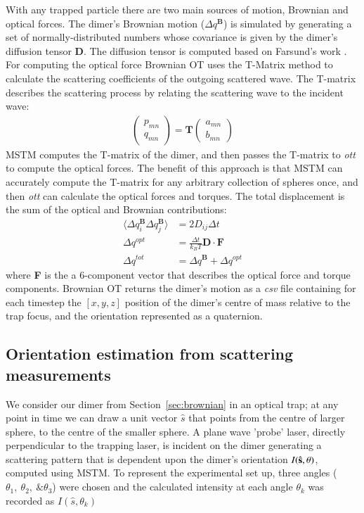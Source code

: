 \documentclass[final, 3p]{elsarticle}
\begin{document}
With any trapped particle there are two main sources of motion,
Brownian and optical forces.  The dimer's Brownian motion
($\Delta q^{\textbf{B}}$) is simulated by generating a set of
normally-distributed numbers whose covariance is given by the dimer's
diffusion tensor $\textbf{D}$.  The diffusion tensor is computed based
on Farsund's work \cite{Farsund1996}. For computing the optical force
Brownian OT uses the T-Matrix method to calculate the scattering
coefficients of the outgoing scattered wave.  The T-matrix describes
the scattering process by relating the scattering wave to the incident
wave:
\begin{align}
	\begin{pmatrix}
		p_{mn} \\
		q_{mn}
	\end{pmatrix}
	= \textbf{T}
	\begin{pmatrix}
		a_{mn} \\
		b_{mn}
	\end{pmatrix}
\end{align}
MSTM computes the T-matrix of the dimer, and then passes the T-matrix
to \textit{ott} to compute the optical forces. The benefit of this
approach is that MSTM can accurately compute the T-matrix for any
arbitrary collection of spheres once, and then \textit{ott} can
calculate the optical forces and torques. The total displacement is
the sum of the optical and Brownian contributions:
\begin{align}
  \langle \Delta q_i^{\textbf{B}} \Delta q_j^{\textbf{B}}\rangle
  &= 2D_{ij} \Delta t
  \\
  \Delta q^{opt} &= \frac{\Delta t}{k_BT}\textbf{D} \cdot \textbf{F}
  \\
\Delta q^{tot} &= \Delta q^{\textbf{B}} + \Delta q^{opt}
\end{align}
where \textbf{F} is the a 6-component vector that describes the
optical force and torque components.  Brownian OT returns the dimer's
motion as a \textit{csv} file containing for each timestep the
$[x,y,z]$ position of the dimer's centre of mass relative to the trap
focus, and the orientation represented as a quaternion.


\subsection{Orientation estimation from scattering measurements}
\label{sec:Bayes}

We consider our dimer from Section~\ref{sec:brownian} in an optical trap; at any point in time we can draw a unit vector $\hat{s}$ that points from the centre of larger sphere, to the centre of the smaller sphere. A plane wave 'probe' laser, directly perpendicular to the trapping laser, is incident on the dimer generating a scattering pattern that is dependent upon the dimer's orientation $I(\hat{\bf s}, \theta)$, computed using MSTM. To represent the experimental set up, three angles  ($\theta_1, \ \theta_2, \ \& \theta_3$) were chosen and the calculated intensity at each angle $\theta_k$ was recorded as $I(\hat{s}, \theta_k)$
\end{document}
